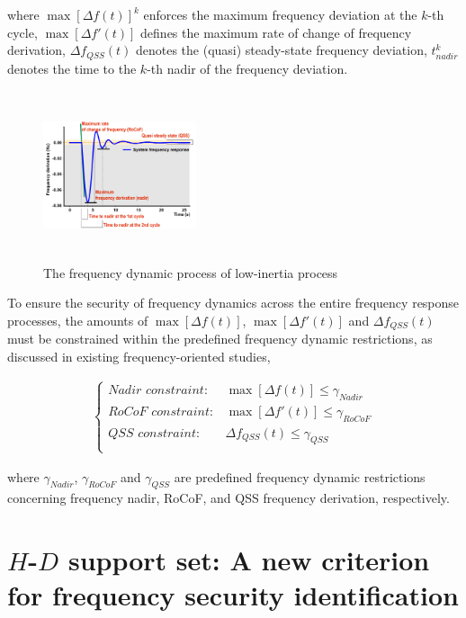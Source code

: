 \documentclass[lettersize,journal]{IEEEtran}
\begin{document}
\noindent
where $\max [\varDelta f(t)]^k$ enforces the maximum frequency deviation at the $k$-th cycle, $\max [\varDelta f'(t)]$ defines the maximum rate of change of frequency derivation, $\varDelta f_{QSS} (t)$ denotes the (quasi) steady-state frequency deviation, $t_{nadir}^k$ denotes the time to the $k$-th nadir of the frequency deviation.

\begin{figure}[h]
  \centering
  \includegraphics[width=0.4\textwidth,height=5cm]{frequency_response.pdf}
  \caption{The frequency dynamic process of low-inertia process}\vspace{-0.125cm}
  \label{fig:sfr}
\end{figure}

To ensure the security of frequency dynamics across the entire frequency response processes, the amounts of $\max[\varDelta f(t)]$, $\max[\varDelta f'(t)]$ and $\varDelta f_{QSS}(t)$ must be constrained within the predefined frequency dynamic restrictions, as discussed in existing frequency-oriented studies,

\begin{subequations}
  \begin{align}
  \left \{
  \begin{array}{rr}
  {Nadir\,\, constraint:}& \max[\varDelta f (t)] \leq \gamma_{Nadir}\\
  {RoCoF\,\, constraint:}&\max[\varDelta f' (t)] \leq \gamma_{RoCoF}\\
  {QSS\,\, constraint:} &\varDelta f_{QSS} (t) \leq \gamma_{QSS}\\
\end{array}
\right.
    \end{align}
  \end{subequations}

  \noindent
where $\gamma_{Nadir}$, $\gamma_{RoCoF}$ and $\gamma_{QSS}$ are predefined frequency dynamic restrictions concerning frequency nadir, RoCoF, and QSS frequency derivation, respectively.

\section{$H$-$D$ support set: A new criterion for frequency security identification}  
\end{document}
